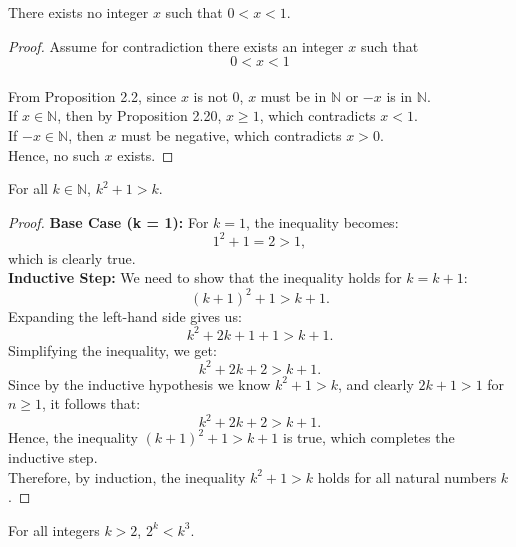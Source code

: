 \documentclass[12pt]{article}
\newenvironment{customprop}[1]{
  \renewcommand\theproposition{#1}
  \proposition
}{\endproposition}
\begin{document}
\begin{customprop}{2.21}
  There exists no integer \( x \) such that \( 0 < x < 1 \).
\end{customprop}

\begin{proof}
  Assume for contradiction there exists an integer \( x \) such that \[ 0 < x < 1 \] \\
  From Proposition 2.2, since \( x \) is not 0, \( x \) must be in \( \mathbb{N} \) or \( -x \) is in \( \mathbb{N} \). \\
  If \( x \in \mathbb{N} \), then by Proposition 2.20, \( x \geq 1 \), which contradicts \( x < 1 \). \\
  If \( -x \in \mathbb{N} \), then \( x \) must be negative, which contradicts \( x > 0 \). \\
  Hence, no such \( x \) exists.
\end{proof}


\begin{customprop}{2.24}
  For all \( k \in \mathbb{N} \), \( k^2 + 1 > k \).
\end{customprop}

\begin{proof}  
  \textbf{Base Case (k = 1):}
  For \( k = 1 \), the inequality becomes:
  \[
  1^2 + 1 = 2 > 1,
  \]
  which is clearly true. \\

  
  \textbf{Inductive Step:}
  We need to show that the inequality holds for \( k = k + 1 \):
  \[
  (k + 1)^2 + 1 > k + 1.
  \]
  Expanding the left-hand side gives us:
  \[
  k^2 + 2k + 1 + 1 > k + 1.
  \]
  Simplifying the inequality, we get:
  \[
  k^2 + 2k + 2 > k + 1.
  \]
  Since by the inductive hypothesis we know \( k^2 + 1 > k \), and clearly \( 2k + 1 > 1 \) for \( n \geq 1 \), it follows that:
  \[
  k^2 + 2k + 2 > k + 1.
  \]
  Hence, the inequality \( (k + 1)^2 + 1 > k + 1 \) is true, which completes the inductive step. \\
  Therefore, by induction, the inequality \( k^2 + 1 > k \) holds for all natural numbers \( k \).
  \end{proof}
  

\begin{customprop}{2.27}
  For all integers \( k > 2 \), \( 2^k < k^3 \).
\end{customprop}
\end{document}
